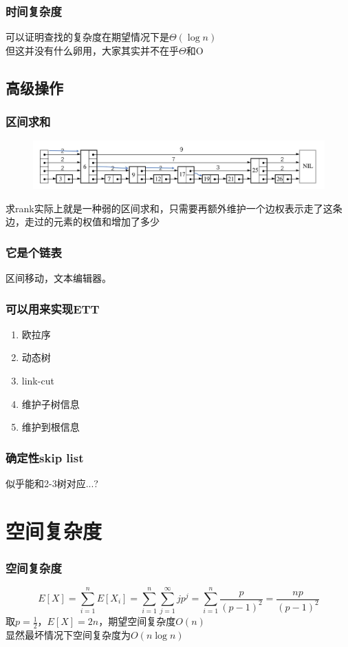 \documentclass{beamer}
\begin{document}
	\begin{frame}
		\frametitle{时间复杂度}
		可以证明查找的复杂度在期望情况下是$\Theta(\log{n})$ \\
		但这并没有什么卵用，大家其实并不在乎$\Theta$和O
	\end{frame}

	\subsection{高级操作}
	\begin{frame}
		\frametitle{区间求和}
		\begin{figure}[H]
			\centering
			\includegraphics[scale=0.25]{./img/rank.jpg}
		\end{figure}
		求rank实际上就是一种弱的区间求和，只需要再额外维护一个边权表示走了这条边，走过的元素的权值和增加了多少
	\end{frame}

	\begin{frame}
		\frametitle{它是个链表}
		区间移动，文本编辑器。
	\end{frame}

	\begin{frame}
		\frametitle{可以用来实现ETT}
		\begin{enumerate}
			\item 欧拉序
			\item 动态树
			\item link-cut
			\item 维护子树信息
			\item 维护到根信息
		\end{enumerate}
	\end{frame}

	\begin{frame}
		\frametitle{确定性skip list}
		似乎能和2-3树对应...?
	\end{frame}

	
	\section{空间复杂度}
	\begin{frame}
		\frametitle{空间复杂度}
		$$E[X] = \sum_{i=1}^{n}E[X_{i}] = \sum_{i=1}^{n}\sum_{j=1}^{\infty}jp^{j} = \sum_{i=1}^{n}\frac{p}{(p-1)^2} = \frac{np}{(p-1)^2}$$
		取$p=\frac{1}{2}$，$E[X] = 2n$，期望空间复杂度$O(n)$ \\
		显然最坏情况下空间复杂度为$O(n\log n)$
	\end{frame}
\end{document}
